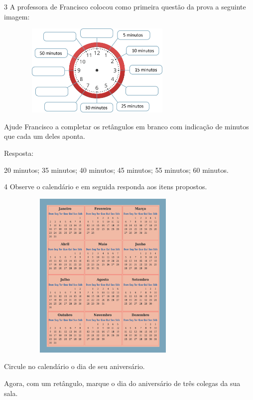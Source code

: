 \begin{multicols}{2}
\num{3} A professora de Francisco colocou como primeira questão da prova a seguinte imagem:


\includegraphics[width=3.90034in,height=1.75015in]{media/image53.png}

Ajude Francisco a completar os retângulos em branco com indicação de
minutos que cada um deles aponta.

Resposta:

20 minutos; 35 minutos; 40 minutos; 45 minutos; 55 minutos; 60 minutos.

\num{4} Observe o calendário e em seguida responda aos itens propostos.


\includegraphics[width=4.13369in,height=3.20861in]{media/image54.png}

\begin{escolha}
\item
  Circule no calendário o dia de seu aniversário.

\item
  Agora, com um retângulo, marque o dia do aniversário de três colegas da sua sala.


\end{escolha}
\end{multicols}
